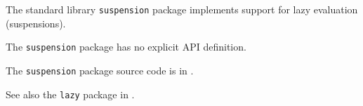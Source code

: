 
The standard library {\tt suspension} package implements support for lazy evaluation 
(suspensions).

The {\tt suspension} package has no explicit API definition.

The {\tt suspension} package source code is in .

See also the {\tt lazy} package in .




